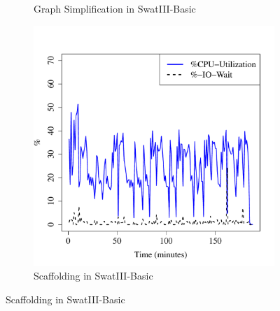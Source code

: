 \documentclass[conference]{IEEEtran}
\begin{document}
\begin{figure}[htb]
\begin{subfigure}[b]{0.3\textwidth}
                \caption{Graph Simplification in SwatIII-Basic}
                \label{fig:ECCPUHDD}
        \end{subfigure} 
        \begin{subfigure}[b]{0.3\textwidth}
                \includegraphics[width=\textwidth]{Figure/SystemData/Plots/SCFCPUHDD.pdf}
                \caption{Scaffolding in SwatIII-Basic}
                \label{fig:SCFCPUHDD}
        \end{subfigure}       
        

\end{figure}
\end{document}
